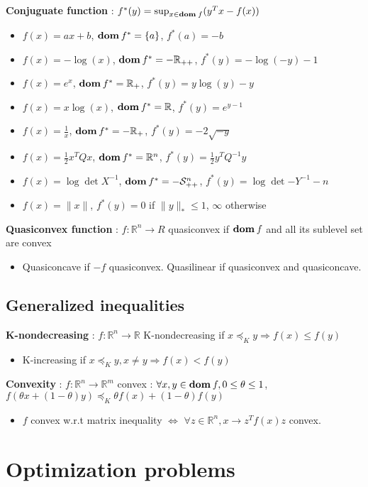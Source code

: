 \documentclass[a4paper, 10pt]{article}
\newcommand{\norm}[1]{\|#1\|}
\newcommand{\R}{\mathbb{R}}
\newcommand{\Rp}{\mathbb{R}_{+}}
\newcommand{\Rpp}{\mathbb{R}_{++}}
\newcommand{\Rn}{\mathbb{R}^n}
\newcommand{\Snpp}{\mathcal{S}_{++}^n}
\newcommand{\dom}[1]{\textbf{dom}\hspace{0.2em}#1}
\newcommand{\wrt}{w.r.t }
\newcommand{\itm}[1]{{\color{itmcolor} \textbf{#1}}}
\begin{document}
\itm{Conjuguate function} : $f^*(y) = \sup_{x \in \dom{f}} (y^T x - f(x))$
\begin{itemize}
\item $f(x) = a x + b$, $\dom{f^*} = \{a\}$, $f^*(a) = -b$
\item $f(x) = - \log(x)$, $\dom{f^*} = -\Rpp$, $f^*(y) = -\log(-y) - 1$
\item $f(x) = e^x$, $\dom{f^*} = \Rp$, $f^*(y) = y \log(y) - y$
\item $f(x) = x \log(x)$, $\dom{f^*} = \R$, $f^*(y) = e^{y - 1}$
\item $f(x) = \frac{1}{x}$, $\dom{f^*} = -\Rp$, $f^*(y) = - 2 \sqrt{-y}$
\item $f(x) = \frac{1}{2}x^T Q x$, $\dom{f^*} = \Rn$, $f^*(y) = \frac{1}{2} y^T Q^{-1} y$
\item $f(x) = \log\det{X^{-1}}$, $\dom{f^*} = -\Snpp$, $f^*(y) = \log\det{-Y}^{-1} - n$
\item $f(x) = \norm{x}$, $f^*(y) = 0$ if $\norm{y}_* \le 1$, $\infty$ otherwise
\end{itemize}

\itm{Quasiconvex function} : $f : \Rn \to R$ quasiconvex if $\dom{f}$ and all its sublevel set are convex
\begin{itemize}
\item Quasiconcave if $-f$ quasiconvex. Quasilinear if quasiconvex and quasiconcave.
\end{itemize}

\subsection{Generalized inequalities}

\itm{K-nondecreasing} : $f : \Rn \to \R$ K-nondecreasing if $x \preceq_K y \Rightarrow f(x) \le f(y)$
\begin{itemize}
\item K-increasing if $x \preceq_K y, x \ne y \Rightarrow f(x) < f(y)$
\end{itemize}

\itm{Convexity} : $f : \R^n \to \R^m$ convex : $\forall x, y \in \dom{f}, 0 \le \theta \le 1$, $f(\theta x + (1 - \theta) y) \preceq_K \theta f(x) + (1 - \theta) f(y)$
\begin{itemize}
\item $f$ convex \wrt matrix inequality $\iff$ $\forall z \in \Rn, x \to z^T f(x) z$ convex.
\end{itemize}

\section{Optimization problems}
\end{document}
